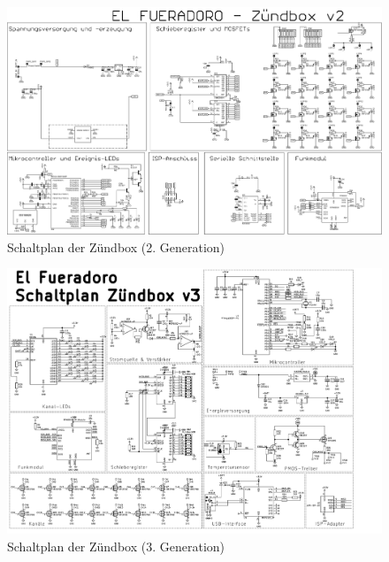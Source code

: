 \documentclass[paper=a4, parskip, numbers=noenddot, toc=listof, headsepline]{scrbook}
\begin{document}
		\begin{figure}
			\centering
			\includegraphics[angle=-90,totalheight=.95\textheight,keepaspectratio]{Bilder/Zuendboxschaltplan2}
			\caption{Schaltplan der Zündbox (2. Generation)}
			\label{fig:zuendbox2schematic}
		\end{figure}

		\begin{figure}
			\centering
			\includegraphics[angle=90,totalheight=.95\textheight,keepaspectratio]{Bilder/Zuendboxschaltplan3}
			\caption{Schaltplan der Zündbox (3. Generation)}
			\label{fig:zuendbox3schematic}
		\end{figure}
\end{document}
